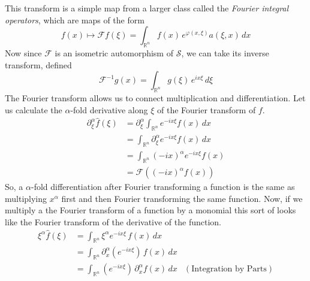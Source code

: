 	This transform is a simple map from a larger class called the \textit{Fourier integral operators}, which are maps of the form 
	\begin{equation}
	  f(x) \mapsto \mathcal{F} f (\xi) = \int_{\mathbb{R}^n} f(x) \, e^{\varphi(x, \xi)} a(\xi, x)\, dx
	\end{equation}
	Now since $\mathcal{F}$ is an isometric automorphism of $\mathcal{S}$, we can take its inverse transform, defined 
	\begin{equation}
	  \mathcal{F}^{-1} g(x) = \int_{\mathbb{R}^n} g(\xi) \, e^{i x \xi} \, d\xi
	\end{equation}
	The Fourier transform allows us to connect multiplication and differentiation. Let us calculate the $\alpha$-fold derivative along $\xi$ of the Fourier transform of $f$. 
	\begin{align*}
			\partial_\xi^\alpha \hat{f}(\xi) & = \partial_\xi^\alpha \int_{\mathbb{R}^n} e^{-i x \xi} f(x)\,dx \\
			& = \int_{\mathbb{R}^n} \partial_\xi^\alpha e^{-i x \xi} f(x)\,dx \\
			& = \int_{\mathbb{R}^n} (-i x)^\alpha e^{-i x \xi} f(x) \\
			& = \mathcal{F}((-ix)^\alpha f(x)) 
	\end{align*}
	So, a $\alpha$-fold differentiation after Fourier transforming a function is the same as multiplying $x^\alpha$ first and then Fourier transforming the same function. Now, if we multiply a the Fourier transform of a function by a monomial this sort of looks like the Fourier transform of the derivative of the function. 
	\begin{align*}
			\xi^\alpha \hat{f}(\xi) & = \int_{\mathbb{R}^n} \xi^\alpha e^{-i x \xi} \, f(x) \, dx \\
			& = \int_{\mathbb{R}^n} \partial_x^\alpha (e^{-i x \xi}) \, f(x)\, dx \\
			& = \int_{\mathbb{R}^n} (e^{-i x \xi}) \, \partial_x^\alpha f(x)\, dx & (\text{Integration by Parts})
	\end{align*}

